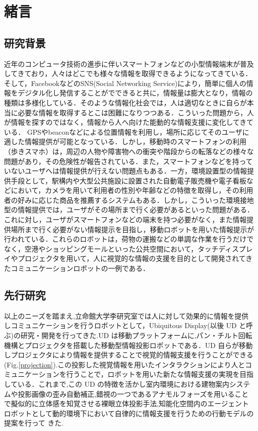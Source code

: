 \documentclass[12pt]{sonota/aislab}
\begin{document}
\egroup

\mainmatter

\chapter{緒言}\label{chap:introduction}

\section{研究背景}
近年のコンピュータ技術の進歩に伴いスマートフォンなどの小型情報端末が普及してきており，人々はどこでも様々な情報を取得できるようになってきている．そして，FacebookなどのSNS(Social Networking Service)により，簡単に個人の情報をデジタル化し発信することがでできると共に，情報量は膨大となり，情報の種類は多様化している．そのような情報化社会では，人は適切なときに自らが本当に必要な情報を取得するとこは困難になりつつある．こういった問題から，人が情報を探すのではなく，情報から人へ向けた能動的な情報支援に変化してきている．
GPSやbeaconなどによる位置情報を利用し，場所に応じてそのユーザに適した情報提供が可能となっている．しかし，移動時のスマートフォンの利用（歩きスマホ）は，周辺の人物や障害物への衝突や階段からの転落などの様々な問題があり，その危険性が報告されている\cite{aruki}．また，スマートフォンなどを持っていないユーザへは情報提供が行えない問題点もある．一方，環境設置型の情報提供手段として，駅構内や大型公共施設に設置された自動電子販売機や電子看板などにおいて，カメラを用いて利用者の性別や年齢などの特徴を取得し，その利用者の好みに応じた商品を推薦するシステムもある．しかし，こういった環境接地型の情報提供では，ユーザがその場所まで行く必要があるといった問題がある．
\\ \indent
これに対し，ユーザがスマートフォンなどの端末を持つ必要がなく，また情報提供場所まで行く必要がない情報提示を目指し，移動ロボットを用いた情報提示が行われている\cite{spencr}\cite{UD}．これらのロボットは，荷物の運搬などの単調な作業を行うだけでなく，空港やショッピングモールといった公共空間において，タッチディスプレイやプロジェクタを用いて，人に視覚的な情報の支援を目的として開発されてきたコミュニケーションロボットの一例である．
\section{先行研究}
以上のニーズを踏まえ,立命館大学李研究室では人に対して効果的に情報を提供しコミュニケーションを行うロボットとして，Ubiquitous Display(以後 UD と呼ぶ)の研究・開発を行ってきた\cite{UD1}\cite{UD2}\cite{UD3}\cite{UD4}\cite{UD5}.UD は移動プラットフォームに,パン・チルト回転機構とプロジェクタを搭載した移動型情報投影ロボットである．UD 自らが移動しプロジェクタにより情報を提供することで視覚的情報支援を行うことができる(Fig.\ref{projection}).この投影した視覚情報を用いたインタラクションにより人とコミュニケーションを行うことで，ロボットを用いた新たな情報支援の実現を目指している．これまで,この UD の特徴を活かし室内環境における建物案内システムや投影画像の歪み自動補正,錯視の一つであるアナモルフォーズを用いることで擬似的に立体感を知覚させる裸眼立体投影手法\cite{UD2},知能化空間内のエージェントロボットとして動的環境下において自律的に情報支援を行うための行動モデルの提案\cite{UD5}を行って
きた.
\end{document}
